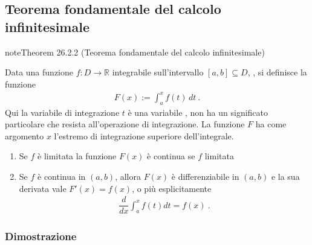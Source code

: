 \documentclass[letterpaper,10pt,italian]{jupyterBook}
\begin{document}
\subsection{Teorema fondamentale del calcolo infinitesimale}
\label{\detokenize{ch/infinitesimal_calculus/integrals:teorema-fondamentale-del-calcolo-infinitesimale}}\label{\detokenize{ch/infinitesimal_calculus/integrals:infinitesimal-calculus-integrals-thm-fund}}\label{ch/infinitesimal_calculus/integrals:integrals:thm:fund}
\begin{sphinxadmonition}{note}{Theorem 26.2.2 (Teorema fondamentale del calcolo infinitesimale)}



\sphinxAtStartPar
Data una funzione \(f: D \rightarrow \mathbb{R}\) integrabile sull’intervallo \([a,b] \subseteq D\), {\hyperref[\detokenize{ch/infinitesimal_calculus/integrals:infinitesimal-calculus:integrals:def:integrable-function}]{}}, si definisce la funzione
\begin{equation*}
\begin{split}F(x) := \int_{a}^{x} f(t) \, dt \ .\end{split}
\end{equation*}
\sphinxAtStartPar
{} Qui la variabile di integrazione \(t\) è una variabile , non ha un significato particolare che resista all’operazione di integrazione. La funzione \(F\) ha come argomento \(x\) l’estremo di integrazione superiore dell’integrale.
\begin{enumerate}
%
\item {} 
\sphinxAtStartPar
Se \(f\) è limitata la funzione \(F(x)\) è continua se \(f\) limitata

\item {} 
\sphinxAtStartPar
Se \(f\) è continua in \((a,b)\), allora \(F(x)\) è differenziabile in \((a,b)\) e la sua derivata vale \(F'(x) = f(x)\), o più esplicitamente
\begin{equation*}
\begin{split}\dfrac{d}{dx} \int_{a}^{x} f(t) dt = f(x) \ .\end{split}
\end{equation*}
\end{enumerate}
\end{sphinxadmonition}
\subsubsection*{Dimostrazione}
\end{document}
